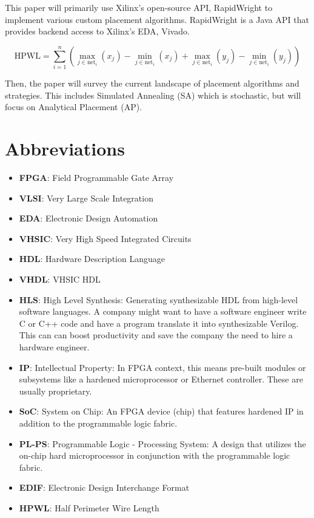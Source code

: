 \documentclass{article}
\begin{document}
This paper will primarily use Xilinx's open-source API, RapidWright to implement various custom placement algorithms.
RapidWright is a Java API that provides backend access to Xilinx's EDA, Vivado. 



\begin{equation}
    \text{HPWL} = \sum_{i=1}^{n} \left( \max_{j \in \text{net}_i} (x_j) - \min_{j \in \text{net}_i} (x_j) + \max_{j \in \text{net}_i} (y_j) - \min_{j \in \text{net}_i} (y_j) \right)
\end{equation}


Then, the paper will survey the current landscape of placement algorithms and strategies. 
This includes Simulated Annealing (SA) which is stochastic, but will focus on Analytical Placement (AP). 


\section{Abbreviations}
\begin{itemize}[label={--}, left=0.25cm]
    \item \textbf{FPGA}: Field Programmable Gate Array
    \item \textbf{VLSI}: Very Large Scale Integration
    \item \textbf{EDA}: Electronic Design Automation
    \item \textbf{VHSIC}: Very High Speed Integrated Circuits
    \item \textbf{HDL}: Hardware Description Language
    \item \textbf{VHDL}: VHSIC HDL
    \item \textbf{HLS}: High Level Synthesis: Generating synthesizable HDL from high-level software languages. A company might want to have a software engineer write C or C++ code and have a program translate it into synthesizable Verilog. This can can boost productivity and save the company the need to hire a hardware engineer.
    \item \textbf{IP}: Intellectual Property: In FPGA context, this means pre-built modules or subsystems like a hardened microprocessor or Ethernet controller. These are usually proprietary.
    \item \textbf{SoC}: System on Chip: An FPGA device (chip) that features hardened IP in addition to the programmable logic fabric.
    \item \textbf{PL-PS}: Programmable Logic - Processing System: A design that utilizes the on-chip hard microprocessor in conjunction with the programmable logic fabric.
    \item \textbf{EDIF}: Electronic Design Interchange Format
    \item \textbf{HPWL}: Half Perimeter Wire Length
\end{itemize}
\end{document}
